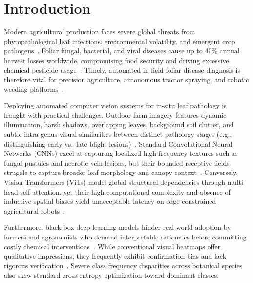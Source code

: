 \documentclass[runningheads]{llncs}
\begin{document}
\section{Introduction}
Modern agricultural production faces severe global threats from phytopathological leaf infections, environmental volatility, and emergent crop pathogens~\cite{ref_mylay2025,ref_singh2024}. Foliar fungal, bacterial, and viral diseases cause up to 40\% annual harvest losses worldwide, compromising food security and driving excessive chemical pesticide usage~\cite{ref_arshad2026,ref_banerjee2025}. Timely, automated in-field foliar disease diagnosis is therefore vital for precision agriculture, autonomous tractor spraying, and robotic weeding platforms~\cite{ref_foysal2024,ref_garg2026}.

Deploying automated computer vision systems for in-situ leaf pathology is fraught with practical challenges. Outdoor farm imagery features dynamic illumination, harsh shadows, overlapping leaves, background soil clutter, and subtle intra-genus visual similarities between distinct pathology stages (e.g., distinguishing early vs.\ late blight lesions)~\cite{ref_deshpande2024,ref_suri2025}. Standard Convolutional Neural Networks (CNNs) excel at capturing localized high-frequency textures such as fungal pustules and necrotic vein lesions, but their bounded receptive fields struggle to capture broader leaf morphology and canopy context~\cite{ref_shabir2024,ref_ahmed2024}. Conversely, Vision Transformers (ViTs) model global structural dependencies through multi-head self-attention, yet their high computational complexity and absence of inductive spatial biases yield unacceptable latency on edge-constrained agricultural robots~\cite{ref_sambana2025,ref_mehnaz2025,ref_tonmoy2025}.

Furthermore, black-box deep learning models hinder real-world adoption by farmers and agronomists who demand interpretable rationales before committing costly chemical interventions~\cite{ref_sakib2026,ref_sheh2026}. While conventional visual heatmaps offer qualitative impressions, they frequently exhibit confirmation bias and lack rigorous verification~\cite{ref_huang2024}. Severe class frequency disparities across botanical species also skew standard cross-entropy optimization toward dominant classes.
\end{document}
